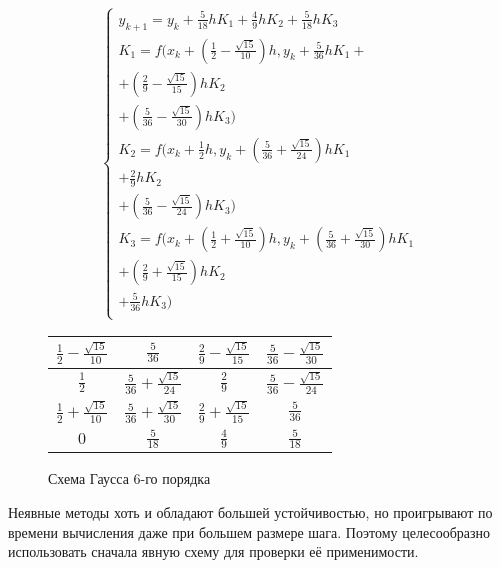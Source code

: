 \begin{figure}
        \begin{minipage}[t]{7.5cm}
        {\small
        \begin{equation*}
            \begin{cases}
                y_{k + 1} = y_k + \frac{5}{18}hK_1 + \frac{4}{9}hK_2 + \frac{5}{18}hK_3\\
                K_1 = f(x_k + (\frac{1}{2} - \frac{\sqrt{15}}{10})h, y_k + \frac{5}{36}hK_1 +\\
                + (\frac{2}{9} - \frac{\sqrt{15}}{15})hK_2\\
                + (\frac{5}{36} - \frac{\sqrt{15}}{30})hK_3)\\
                K_2 = f(x_k + \frac{1}{2}h, y_k + (\frac{5}{36} + \frac{\sqrt{15}}{24})hK_1\\
                + \frac{2}{9}hK_2\\
                + (\frac{5}{36} - \frac{\sqrt{15}}{24})hK_3)\\
                K_3 = f(x_k + (\frac{1}{2} + \frac{\sqrt{15}}{10})h, y_k + (\frac{5}{36} + \frac{\sqrt{15}}{30})hK_1\\
                + (\frac{2}{9} + \frac{\sqrt{15}}{15})hK_2\\
                + \frac{5}{36}hK_3)\\
            \end{cases}
        \end{equation*}
        }
    \end{minipage}
    \begin{minipage}[t]{7.5cm}
        \begin{table}
            \begin{tabular}{|c|c|c|c|}
                \hline
                $\frac{1}{2} - \frac{\sqrt{15}}{10}$ & $\frac{5}{36}$ & $\frac{2}{9} - \frac{\sqrt{15}}{15}$ & $\frac{5}{36} - \frac{\sqrt{15}}{30}$\\
                \hline
                $\frac{1}{2}$ & $\frac{5}{36} + \frac{\sqrt{15}}{24}$ & $\frac{2}{9}$ & $\frac{5}{36} - \frac{\sqrt{15}}{24}$\\
                \hline
                $\frac{1}{2} + \frac{\sqrt{15}}{10}$ & $\frac{5}{36} + \frac{\sqrt{15}}{30}$ & $\frac{2}{9} + \frac{\sqrt{15}}{15}$ & $\frac{5}{36}$\\
                \hline
                $0$ &  $\frac{5}{18}$ &  $\frac{4}{9}$ &  $\frac{5}{18}$\\
                \hline
            \end{tabular}
        \end{table}
    \end{minipage}
    \caption{Схема Гаусса 6-го порядка}
    \label{fig:Gauss6}
\end{figure}

Неявные методы хоть и обладают большей устойчивостью, но проигрывают по времени вычисления даже при большем размере шага. Поэтому целесообразно использовать сначала явную схему для проверки её применимости.
